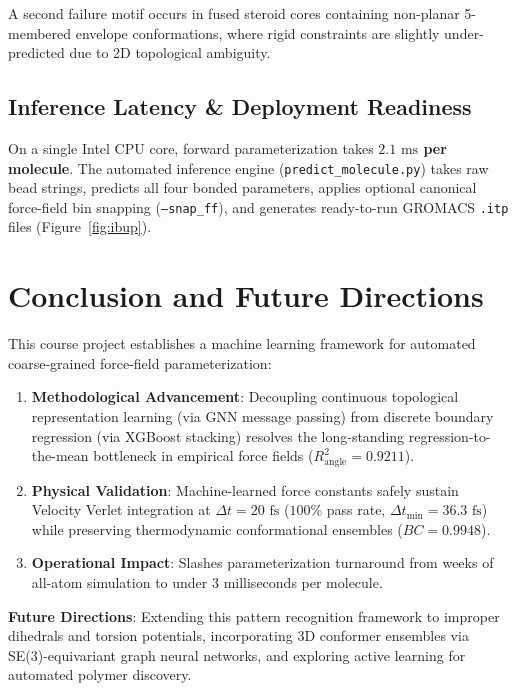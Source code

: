 \documentclass[11pt,a4paper]{article}
\begin{document}
A second failure motif occurs in fused steroid cores containing non-planar 5-membered envelope conformations, where rigid constraints are slightly under-predicted due to 2D topological ambiguity.

\subsection{Inference Latency \& Deployment Readiness}
On a single Intel CPU core, forward parameterization takes \textbf{$2.1\text{ ms}$ per molecule}. The automated inference engine (\texttt{predict\_molecule.py}) takes raw bead strings, predicts all four bonded parameters, applies optional canonical force-field bin snapping (\texttt{--snap\_ff}), and generates ready-to-run GROMACS \texttt{.itp} files (Figure~\ref{fig:ibup}).

\section{Conclusion and Future Directions}
\label{sec:conclusion}

This course project establishes a machine learning framework for automated coarse-grained force-field parameterization:
\begin{enumerate}
    \item \textbf{Methodological Advancement}: Decoupling continuous topological representation learning (via GNN message passing) from discrete boundary regression (via XGBoost stacking) resolves the long-standing regression-to-the-mean bottleneck in empirical force fields ($R^2_{\text{angle}} = \mathbf{0.9211}$).
    \item \textbf{Physical Validation}: Machine-learned force constants safely sustain Velocity Verlet integration at $\Delta t = 20\text{ fs}$ ($100\%$ pass rate, $\Delta t_{\min} = 36.3\text{ fs}$) while preserving thermodynamic conformational ensembles ($BC = 0.9948$).
    \item \textbf{Operational Impact}: Slashes parameterization turnaround from weeks of all-atom simulation to under 3 milliseconds per molecule.
\end{enumerate}

\textbf{Future Directions}: Extending this pattern recognition framework to improper dihedrals and torsion potentials, incorporating 3D conformer ensembles via SE(3)-equivariant graph neural networks, and exploring active learning for automated polymer discovery.



\end{document}
